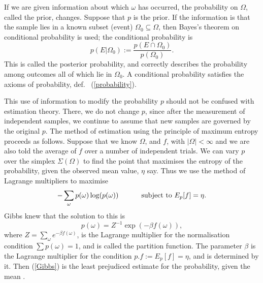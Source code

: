 If we are given information about which $\omega$ has occurred, the
probability on $\Omega$, called the prior, changes. Suppose that $p$ is
the prior. If the information is that the sample lies in a known subset
(event) $\Omega_0\subseteq\Omega$, then Bayes's theorem on conditional
probability is used; the conditional probability is
\begin{equation}
p(E|\Omega_0):=\frac{p(E\cap\Omega_0)}{p(\Omega_0)}.
\end{equation}
This is called the posterior probability, and correctly describes the
probability among outcomes all of which lie in $\Omega_0$. A conditional
probability satisfies the axioms of probability, def.~ (\ref{probability}).

This use of information to modify the probability $p$ should not
be confused with estimation theory. There, we do not change $p$, since
after the measurement of independent samples, we continue to assume that
new samples are governed by the original $p$.
The method of estimation using the principle of maximum entropy proceeds
as follows. Suppose that we
know $\Omega$, and $f$, with $|\Omega|<\infty$ and we are also told the
average of $f$ over a number of independent trials.
We can vary $p$ over the simplex $\Sigma(\Omega)$ to find the
point that maximises the entropy of the probability, given the observed
mean value, $\eta$ say. Thus we use the method of Lagrange multipliers to
maximise
\[-\sum_\omega p(\omega)\log(p(\omega))\hspace{.4in}
\mbox{ subject to }E_p[f]=\eta.\]
Gibbs knew that the solution to this is
\begin{equation}
p(\omega)=Z^{-1}\exp(-\beta f(\omega)),
\label{Gibbs}
\end{equation}
where $Z=\sum_\omega e^{-\beta f(\omega)}$, is the Lagrange multiplier for
the normalisation condition $\sum p(\omega)=1$, and is called the
partition function. The parameter $\beta$ is the Lagrange multiplier for
the condition $p.f:=E_p[f]=\eta$, and is determined by it. Then (\ref{Gibbs})
is the least prejudiced estimate for the probability, given the mean
\cite{Ingarden,Jaynes}.

